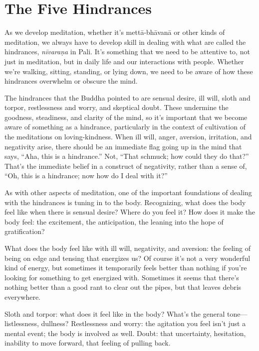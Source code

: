 \chapter{The Five Hindrances}

As we develop meditation, whether it’s mettā-bhāvanā or other kinds of
meditation, we always have to develop skill in dealing with what are
called the hindrances, \emph{nīvaraṇa} in Pali. It’s something that we
need to be attentive to, not just in meditation, but in daily life and
our interactions with people. Whether we’re walking, sitting, standing,
or lying down, we need to be aware of how these hindrances overwhelm or
obscure the mind.

The hindrances that the Buddha pointed to are sensual desire, ill will,
sloth and torpor, restlessness and worry, and skeptical doubt. These
undermine the goodness, steadiness, and clarity of the mind, so it’s
important that we become aware of something as a hindrance, particularly
in the context of cultivation of the meditations on loving-kindness.
When ill will, anger, aversion, irritation, and negativity arise, there
should be an immediate flag going up in the mind that says, “Aha, this
is a hindrance.” Not, “That schmuck; how could they do that?” That’s the
immediate belief in a construct of negativity, rather than a sense of,
“Oh, this is a hindrance; now how do I deal with it?”

As with other aspects of meditation, one of the important foundations of
dealing with the hindrances is tuning in to the body. Recognizing, what
does the body feel like when there is sensual desire? Where do you feel
it? How does it make the body feel: the excitement, the anticipation,
the leaning into the hope of gratification?

What does the body feel like with ill will, negativity, and aversion:
the feeling of being on edge and tensing that energizes us? Of course
it’s not a very wonderful kind of energy, but sometimes it temporarily
feels better than nothing if you’re looking for something to get
energized with. Sometimes it seems that there’s nothing better than a
good rant to clear out the pipes, but that leaves debris everywhere.

Sloth and torpor: what does it feel like in the body? What’s the general
tone—listlessness, dullness? Restlessness and worry: the agitation you
feel isn’t just a mental event; the body is involved as well. Doubt:
that uncertainty, hesitation, inability to move forward, that feeling of
pulling back.

